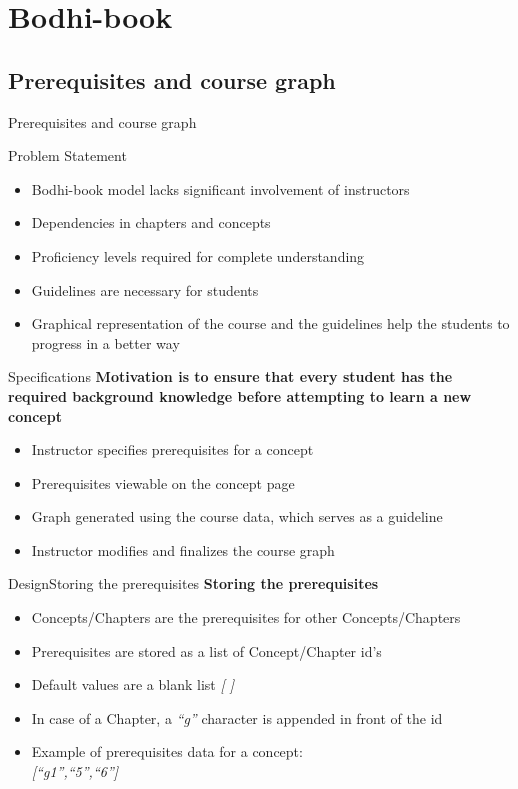 \documentclass[xcolor=table]{beamer}
\begin{document}
\section{Bodhi-book}

\subsection{Prerequisites and course graph}

\begin{frame}{Prerequisites and course graph}
	\begin{block}{Problem Statement}
		\begin{itemize}
			\item Bodhi-book model lacks significant involvement of instructors
			\item Dependencies in chapters and concepts
			\item Proficiency levels required for complete understanding
			\item Guidelines are necessary for students
			\item Graphical representation of the course and the guidelines help the students to progress in a better way
		\end{itemize}
	\end{block}
\end{frame}

\begin{frame}{Specifications}
	\textbf{Motivation is to ensure that every student has the required background knowledge before attempting to learn a new concept}
	\begin{itemize}
		\item Instructor specifies prerequisites for a concept
		\item Prerequisites viewable on the concept page
		\item Graph generated using the course data, which serves as a guideline
		\item Instructor modifies and finalizes the course graph
	\end{itemize}	
\end{frame}

\begin{frame}{Design}{Storing the prerequisites}
	\textbf{Storing the prerequisites}
	\begin{itemize}
		\item Concepts/Chapters are the prerequisites for other Concepts/Chapters
		\item Prerequisites are stored as a list of Concept/Chapter id's
		\item Default values are a blank list \textit{[ ]}
		\item In case of a Chapter, a \textit{``g''} character is appended in front of the id
		\item Example of prerequisites data for a concept: \\
		\textit{[``g1'',``5'',``6'']}
	\end{itemize}
\end{frame}
\end{document}
